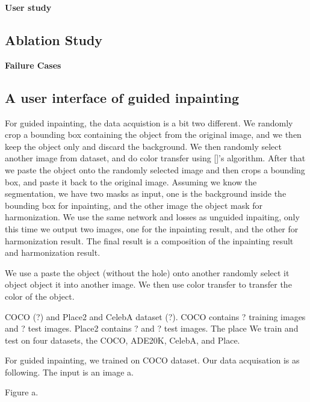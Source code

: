 \noindent\textbf{User study}


\subsection{Ablation Study}
\label{exp:study}

\noindent\textbf{Failure Cases}
\subsection{A user interface of guided inpainting}
\label{exp:guided} 

For guided inpainting, the data acquistion is a bit two different. We randomly crop a bounding box containing the object from the original image, and we then keep the object only and discard the background. We then randomly select another image from dataset, and do color transfer using []'s algorithm. After that we paste the object onto the randomly selected image and then crops a bounding box, and paste it back to the original image. Assuming we know the segmentation, we have two masks as input, one is the background inside the bounding box for inpainting, and the other image the object mask for harmonization. We use the same network and losses as unguided inpaiting, only this time we output two images, one for the inpainting result, and the other for harmonization result. The final result is a composition of the inpainting result and harmonization result.

We use a  
 paste the object (without the hole) onto another randomly select it object object it into another image. We then use color transfer to transfer the color of the object. 


COCO (?) and Place2 and CelebA dataset (?). COCO contains ? training images and ? test images. Place2 contains ?  and ? test images. The place
We train and test on four datasets, the COCO, ADE20K, CelebA, and Place. 

For guided inpainting, we trained on COCO dataset. Our data acquisation is as following. The input is an image a.

Figure a.



